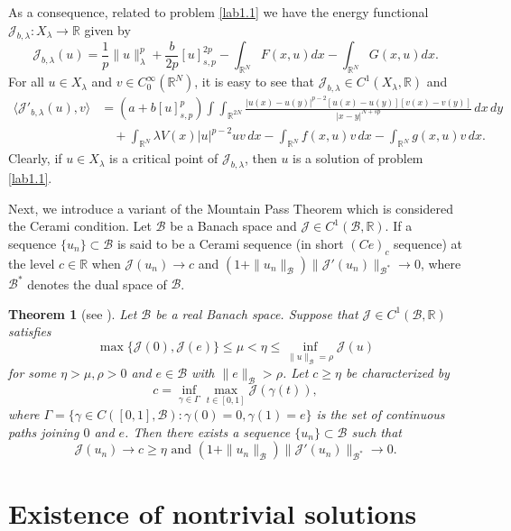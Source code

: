 \documentclass[10pt,a4paper]{amsart}
\numberwithin{equation}{section}
\newtheorem{theorem}{Theorem}[section]
\begin{document}
As a consequence, related to problem \eqref{lab1.1} we have the energy functional 
$\mathcal{J}_{b,\lambda}:X_\lambda\to \mathbb{R}$ given by
\[
 \mathcal{J}_{b,\lambda}(u)= \frac{1}{p}\|u\|^p_\lambda+\frac{b}{2p}[u]^{2p}_{s,p}
 -\int_{\mathbb{R}^N}F(x,u)dx-\int_{\mathbb{R}^N}G(x,u)dx.
\]
For all $u\in X_\lambda$ and $v\in C_0^\infty(\mathbb{R}^N)$, it is easy to see that 
$\mathcal{J}_{b,\lambda}\in C^1({X_\lambda},\mathbb{R})$ and
\begin{align*}
\langle \mathcal{J}'_{b,\lambda}(u),v\rangle
&= (a+b[u]^p_{s,p})
\int\int_{\mathbb{R}^{2N}}\frac{|u(x)-u(y)|^{p-2}[u(x)-u(y)][v(x)-v(y)]}
{|x-y|^{N+sp}}\,dx\,dy    \\
&\quad +\int_{\mathbb{R}^N}\lambda V(x)|u|^{p-2}uv\,dx
-\int_{\mathbb{R}^N}f(x,u)v\,dx-\int_{\mathbb{R}^N}g(x, u)v\,dx.
\end{align*}
Clearly, if $u\in X_\lambda$ is a critical point of $\mathcal{J}_{b,\lambda}$, 
then $u$ is a solution of problem \eqref{lab1.1}.

Next, we introduce a variant of the Mountain Pass Theorem  \cite{r7} which is 
considered the Cerami condition. Let $\mathcal{B}$ be a Banach space and 
$\mathcal{J} \in C^1(\mathcal{B}, \mathbb{R})$. 
If a sequence $\{u_n\}\subset \mathcal{B}$ is said to be a Cerami sequence 
(in short $(Ce)_c$ sequence) at the level $c\in \mathbb{R}$ when 
$\mathcal{J}(u_n)\to  c$ and 
$(1+\|u_n\|_\mathcal{B})\|\mathcal{J}'(u_n)\|_{\mathcal{B}^*}\to  0$, where 
$\mathcal{B}^*$ denotes the dual space of $\mathcal{B}$.

\begin{theorem}[see \cite{r7}] \label{thm2.4}
Let $\mathcal{B}$ be a real Banach space. Suppose that 
$\mathcal{J} \in C^1(\mathcal{B}, \mathbb{R})$ satisfies
$$
\max \{\mathcal{J}(0), \mathcal{J}(e)\}
\leq \mu<\eta\leq \inf_{\|u\|_\mathcal{B}=\rho}\mathcal{J}(u)
$$
for some $\eta>\mu, \rho>0$ and $e\in \mathcal{B}$ with $\|e\|_\mathcal{B}>\rho$. 
Let $c\geq \eta$ be characterized by
$$
c=\inf_{\gamma\in\Gamma}\max_{t\in[0,1]}\mathcal{J}(\gamma(t)),
$$
where $\Gamma=\{\gamma\in C([0,1],\mathcal{B}):\gamma(0)=0,\gamma(1)=e\}$ is the set 
of continuous paths joining $0$ and $e$. Then there exists a sequence 
$\{u_n\} \subset \mathcal{B}$ such that
$$
\mathcal{J}(u_n)\to  c\geq \eta\text{ and }
 (1+\|u_n\|_\mathcal{B})\|\mathcal{J}'(u_n)\|_{\mathcal{B}^*}\to  0.
 $$
\end{theorem}

\section{Existence of nontrivial solutions}
\end{document}
